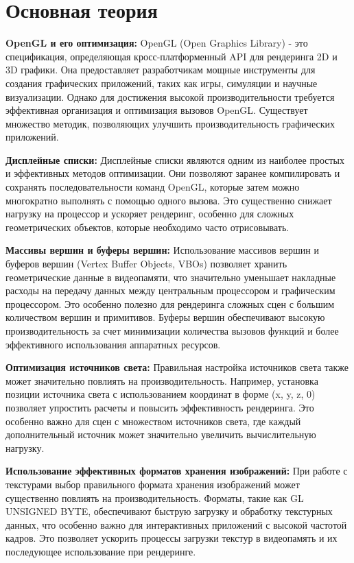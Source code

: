\documentclass[a4paper, 14pt]{extarticle}
\begin{document}
\section{Основная теория}
\par
\textbf{OpenGL и его оптимизация:} OpenGL (Open Graphics Library) - это спецификация, определяющая кросс-платформенный API для рендеринга 2D и 3D графики. Она предоставляет разработчикам мощные инструменты для создания графических приложений, таких как игры, симуляции и научные визуализации. Однако для достижения высокой производительности требуется эффективная организация и оптимизация вызовов OpenGL. Существует множество методик, позволяющих улучшить производительность графических приложений.
\par
\textbf{Дисплейные списки:} Дисплейные списки являются одним из наиболее простых и эффективных методов оптимизации. Они позволяют заранее компилировать и сохранять последовательности команд OpenGL, которые затем можно многократно выполнять с помощью одного вызова. Это существенно снижает нагрузку на процессор и ускоряет рендеринг, особенно для сложных геометрических объектов, которые необходимо часто отрисовывать.
\par
\textbf{Массивы вершин и буферы вершин:} Использование массивов вершин и буферов вершин (Vertex Buffer Objects, VBOs) позволяет хранить геометрические данные в видеопамяти, что значительно уменьшает накладные расходы на передачу данных между центральным процессором и графическим процессором. Это особенно полезно для рендеринга сложных сцен с большим количеством вершин и примитивов. Буферы вершин обеспечивают высокую производительность за счет минимизации количества вызовов функций и более эффективного использования аппаратных ресурсов.
\par
\textbf{Оптимизация источников света:} Правильная настройка источников света также может значительно повлиять на производительность. Например, установка позиции источника света с использованием координат в форме (x, y, z, 0) позволяет упростить расчеты и повысить эффективность рендеринга. Это особенно важно для сцен с множеством источников света, где каждый дополнительный источник может значительно увеличить вычислительную нагрузку.
\par
\textbf{Использование эффективных форматов хранения изображений:} При работе с текстурами выбор правильного формата хранения изображений может существенно повлиять на производительность. Форматы, такие как GL UNSIGNED BYTE, обеспечивают быструю загрузку и обработку текстурных данных, что особенно важно для интерактивных приложений с высокой частотой кадров. Это позволяет ускорить процессы загрузки текстур в видеопамять и их последующее использование при рендеринге.
\pagebreak
\end{document}
